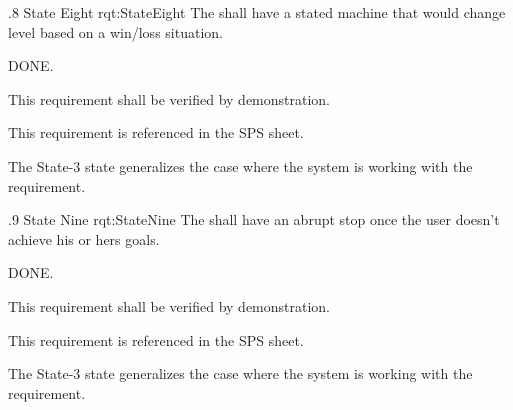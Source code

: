 \ONERQMTV
{\RqtNumberBase.8}
{State Eight}
{rqt:StateEight}
{The \ThisSys shall have a stated machine that would change level based on a win/loss situation.}
{
	\item [Phase 1] DONE.
}
{This requirement shall be verified by demonstration.}
{
	\item [SPS] This requirement is referenced in the SPS sheet.
}
{
	\item The State-3 state generalizes the case where the system is working with the requirement.
}


\ONERQMTV
{\RqtNumberBase.9}
{State Nine}
{rqt:StateNine}
{The \ThisSys shall have an abrupt stop once the user doesn't achieve his or hers goals.}
{
	\item [Phase 1] DONE.

}
{This requirement shall be verified by demonstration.}
{
	\item [SPS] This requirement is referenced in the SPS sheet.
}
{
	\item The State-3 state generalizes the case where the system is working with the requirement.
}


